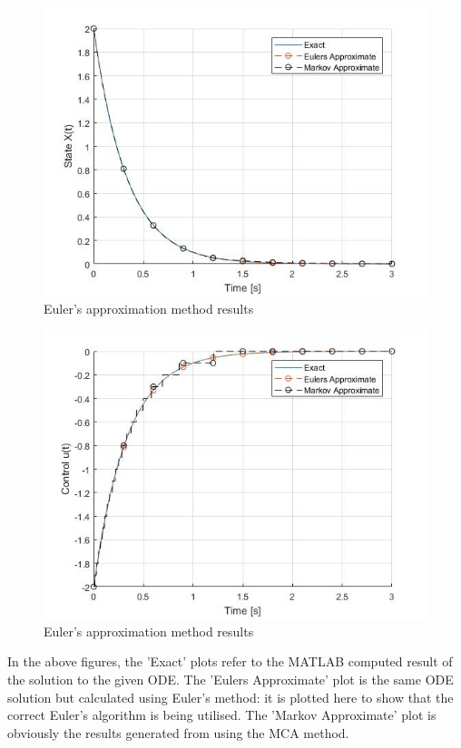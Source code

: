 \documentclass[11pt,draftd]{article}
\begin{document}
\begin{figure}[h!]
	\centering
	\label{eulersmethod1}
	\includegraphics[scale = 0.6]{EulersApproximateState}
	\caption{Euler's approximation method results}
\end{figure}
\begin{figure}[h!]
	\centering
	\label{eulersmethod2}
	\includegraphics[scale = 0.6]{EulersApproximateControl}
	\caption{Euler's approximation method results}
\end{figure}

\noindent In the above figures, the 'Exact' plots refer to the MATLAB computed result of the solution to the given ODE. The 'Eulers Approximate' plot is the same ODE solution but calculated using Euler's method: it is plotted here to show that the correct Euler's algorithm is being utilised. The 'Markov Approximate' plot is obviously the results generated from using the MCA method.
\end{document}
